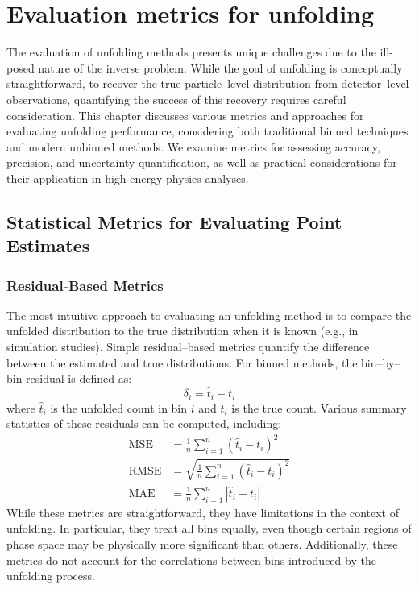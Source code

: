 \section{Evaluation metrics for unfolding}
The evaluation of unfolding methods presents unique challenges due to the ill-posed nature of the inverse problem.
%
While the goal of unfolding is conceptually straightforward, to recover the true particle--level distribution from detector--level observations, quantifying the success of this recovery requires careful consideration.
%
This chapter discusses various metrics and approaches for evaluating unfolding performance, considering both traditional binned techniques and modern unbinned methods.
%
We examine metrics for assessing accuracy, precision, and uncertainty quantification, as well as practical considerations for their application in high-energy physics analyses.

\subsection{Statistical Metrics for Evaluating Point Estimates}
\subsubsection{Residual-Based Metrics}
The most intuitive approach to evaluating an unfolding method is to compare the unfolded distribution to the true distribution when it is known (e.g., in simulation studies).
%
Simple residual--based metrics quantify the difference between the estimated and true distributions.
%
For binned methods, the bin--by--bin residual is defined as:
\begin{equation}
\delta_i = \hat{t}_i - t_i
\end{equation}
where \(\hat{t}_i\) is the unfolded count in bin \(i\) and \(t_i\) is the true count.
%
Various summary statistics of these residuals can be computed, including:
\begin{align}
\text{MSE} &= \frac{1}{n}\sum_{i=1}^{n}(\hat{t}_i - t_i)^2\\
\text{RMSE} &= \sqrt{\frac{1}{n}\sum_{i=1}^{n}(\hat{t}_i - t_i)^2}\\
\text{MAE} &= \frac{1}{n}\sum_{i=1}^{n}|\hat{t}_i - t_i|
\end{align}
While these metrics are straightforward, they have limitations in the context of unfolding.
%
In particular, they treat all bins equally, even though certain regions of phase space may be physically more significant than others.
%
Additionally, these metrics do not account for the correlations between bins introduced by the unfolding process.

